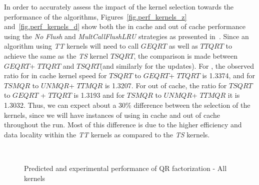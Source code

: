 \documentclass[a4paper,twopages]{article}
\newcommand{\GEQRT}{\ensuremath{\mathit{GEQRT}}\xspace}
\newcommand{\TSQRT}{\ensuremath{\mathit{TSQRT}}\xspace}
\newcommand{\UNMQR}{\ensuremath{\mathit{UNMQR}}\xspace}
\newcommand{\TSMQR}{\ensuremath{\mathit{TSMQR}}\xspace}
\newcommand{\TTQRT}{\ensuremath{\mathit{TTQRT}}\xspace}
\newcommand{\TTMQR}{\ensuremath{\mathit{TTMQR}}\xspace}
\begin{document}
In order to accurately assess the impact of the kernel selection towards the
performance of the algorithms, Figures~\ref{fig.perf_kernels_z}
and~\ref{fig.perf_kernels_d} show both the in cache and out of cache
performance using the \emph{No Flush} and \emph{MultCallFlushLRU} strategies as
presented in~\cite{lawn242,Whaley:2008:AAC:1462062.1462065}.  Since an
algorithm using \emph{TT} kernels will need to call
\GEQRT as well as \TTQRT to achieve the same as the \emph{TS} kernel \TSQRT, the comparison is made
between \GEQRT + \TTQRT and \TSQRT (and similarly for the updates).  For , the observed ratio for in
cache kernel speed for \TSQRT to \GEQRT + \TTQRT is 1.3374, and for \TSMQR to
\UNMQR + \TTMQR is 1.3207. For out of cache, the ratio for \TSQRT to \GEQRT
+ \TTQRT is 1.3193 and for \TSMQR to \UNMQR + \TTMQR it is 1.3032.  Thus, we
can expect about a 30\% difference between the selection of the kernels, since
we will have instances of using in cache and out of cache throughout the run.
Most of this difference is due to the higher efficiency and data locality
within the \emph{TT} kernels as compared to the
\emph{TS} kernels.


\begin{sidewaysfigure*}
\centering
{}
\\
\caption{\label{fig.fig_aa_pic1_p40}
Predicted and experimental performance of QR factorization - All kernels}
\end{sidewaysfigure*}
\end{document}
